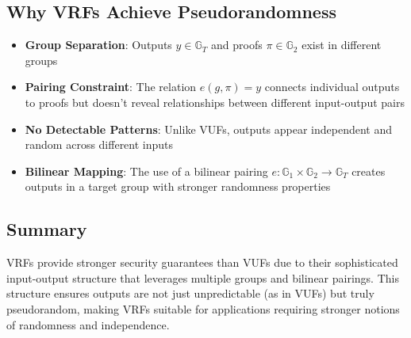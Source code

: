 \subsection{Why VRFs Achieve Pseudorandomness}
\begin{itemize}
    \item \textbf{Group Separation}: Outputs $y \in \mathbb{G}_T$ and proofs $\pi \in \mathbb{G}_2$ exist in different groups
    \item \textbf{Pairing Constraint}: The relation $e(g, \pi) = y$ connects individual outputs to proofs but doesn't reveal relationships between different input-output pairs
    \item \textbf{No Detectable Patterns}: Unlike VUFs, outputs appear independent and random across different inputs
    \item \textbf{Bilinear Mapping}: The use of a bilinear pairing $e: \mathbb{G}_1 \times \mathbb{G}_2 \rightarrow \mathbb{G}_T$ creates outputs in a target group with stronger randomness properties
\end{itemize}

\subsection{Summary}
VRFs provide stronger security guarantees than VUFs due to their sophisticated input-output structure that leverages multiple groups and bilinear pairings. This structure ensures outputs are not just unpredictable (as in VUFs) but truly pseudorandom, making VRFs suitable for applications requiring stronger notions of randomness and independence.